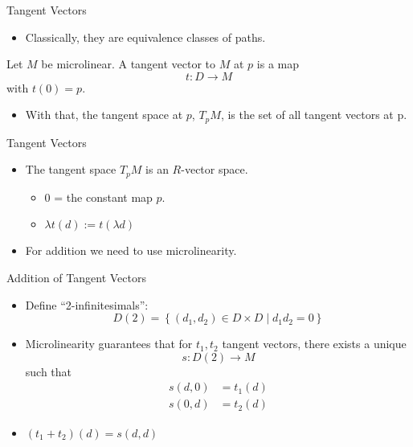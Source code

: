 \documentclass{beamer}
\begin{document}
\begin{frame}{Tangent Vectors}

  \begin{itemize}
    \item Classically, they are equivalence classes of paths.
  \end{itemize}
  \pause
  \begin{defn}
    Let \( M \) be microlinear. A \alert{tangent vector} to \( M \) at \( p \) is a map
    \begin{equation*}
      t:D\to M
    \end{equation*}
    with \( t(0)=p \).
  \end{defn}
  \pause
  \begin{itemize}
    \item With that, the \alert{tangent space} at \( p \), \( T_pM \), is the set of all
      tangent vectors at p.
  \end{itemize}

\end{frame}

\begin{frame}{Tangent Vectors}
  \begin{itemize}
    \item The tangent space \( T_pM \) is an \( R \)-vector space.
      \begin{itemize}
        \item \( 0 \) = the constant map \( p \).
        \item \( \lambda t(d) := t(\lambda d)\)
      \end{itemize}
    \item For addition we need to use microlinearity.
  \end{itemize}
\end{frame}

\begin{frame}{Addition of Tangent Vectors}
  \begin{itemize}
    \item Define ``2-infinitesimals'':
      \begin{equation*}
        D(2) =  \left\{(d_1,d_2)\in D\times D \mid d_1d_2 = 0\right\}
      \end{equation*}
    \item Microlinearity guarantees that for \( t_1, t_2 \) tangent vectors,
      there exists a unique
      \begin{equation*}
        s:D(2)\to M
      \end{equation*}
      such that
      \begin{align*}
        s(d,0) &= t_1(d)\\
        s(0,d) &= t_2(d)
      \end{align*}
    \item \( (t_1 + t_2)(d) = s(d,d) \)
  \end{itemize}
\end{frame}
\end{document}
